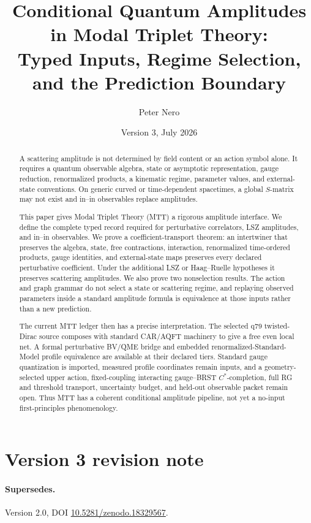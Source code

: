 \documentclass[11pt,a4paper]{article}
\title{\textbf{Conditional Quantum Amplitudes in Modal Triplet Theory:}\\
\large Typed Inputs, Regime Selection, and the Prediction Boundary}
\author{Peter Nero}
\date{Version 3, July 2026}
\numberwithin{equation}{section}
\theoremstyle{definition}
\theoremstyle{remark}
\begin{document}
\maketitle

\begin{abstract}
A scattering amplitude is not determined by field content or an action
symbol alone.  It requires a quantum observable algebra, state or
asymptotic representation, gauge reduction, renormalized products, a
kinematic regime, parameter values, and external-state conventions.  On
generic curved or time-dependent spacetimes, a global \(S\)-matrix may not
exist and in--in observables replace amplitudes.

This paper gives Modal Triplet Theory (MTT) a rigorous amplitude interface.
We define the complete typed record required for perturbative
correlators, LSZ amplitudes, and in--in observables.  We prove a
coefficient-transport theorem: an intertwiner that preserves the algebra,
state, free contractions, interaction, renormalized time-ordered
products, gauge identities, and external-state maps preserves every
declared perturbative coefficient.  Under the additional LSZ or
Haag--Ruelle hypotheses it preserves scattering amplitudes.  We also prove
two nonselection results.  The action and graph grammar do not select a
state or scattering regime, and replaying observed parameters inside a
standard amplitude formula is equivalence at those inputs rather than a
new prediction.

The current MTT ledger then has a precise interpretation.  The selected
q79 twisted-Dirac source composes with standard CAR/AQFT machinery to give
a free even local net.  A formal perturbative BV/QME bridge and embedded
renormalized-Standard-Model profile equivalence are available at their
declared tiers.  Standard gauge quantization is imported, measured profile
coordinates remain inputs, and a geometry-selected upper action,
fixed-coupling interacting gauge--BRST \(C^*\)-completion, full RG and
threshold transport, uncertainty budget, and held-out observable packet
remain open.  Thus MTT has a coherent conditional amplitude pipeline, not
yet a no-input first-principles phenomenology.
\end{abstract}

\section*{Version 3 revision note}

\paragraph{Supersedes.} Version 2.0, DOI
\href{https://doi.org/10.5281/zenodo.18329567}{10.5281/zenodo.18329567}.
\end{document}

